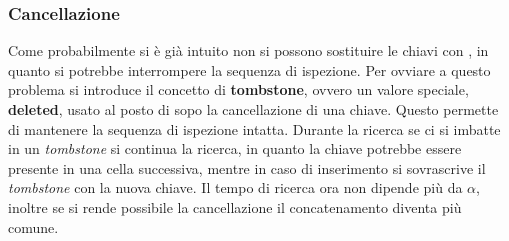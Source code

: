         \subsubsection{Cancellazione} 
            Come probabilmente si è già intuito non si possono sostituire le chiavi con \Nil, in quanto si potrebbe interrompere la sequenza di ispezione. Per ovviare a questo problema si introduce il concetto di \textbf{tombstone}, ovvero un valore speciale, \textbf{deleted}, usato al posto di \Nil sopo la cancellazione di una chiave. Questo permette di mantenere la sequenza di ispezione intatta.\newline
            Durante la ricerca se ci si imbatte in un \textit{tombstone} si continua la ricerca, in quanto la chiave potrebbe essere presente in una cella successiva, mentre in caso di inserimento si sovrascrive il \textit{tombstone} con la nuova chiave.\newline
            Il tempo di ricerca ora non dipende più da $\alpha$, inoltre se si rende possibile la cancellazione il concatenamento diventa più comune.
